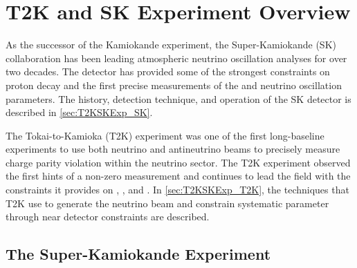 \chapter{T2K and SK Experiment Overview}
\label{chap:T2KSKExp}

As the successor of the Kamiokande experiment, the Super-Kamiokande (SK) collaboration has been leading atmospheric neutrino oscillation analyses for over two decades. The detector has provided some of the strongest constraints on proton decay and the first precise measurements of the  and  neutrino oscillation parameters.
The history, detection technique, and operation of the SK detector is described in \autoref{sec:T2KSKExp_SK}.

The Tokai-to-Kamioka (T2K) experiment was one of the first long-baseline experiments to use both neutrino and antineutrino beams to precisely measure charge parity violation within the neutrino sector. The T2K experiment observed the first hints of a non-zero  measurement and continues to lead the field with the constraints it provides on , ,  and .
In \autoref{sec:T2KSKExp_T2K}, the techniques that T2K use to generate the neutrino beam and constrain systematic parameter through near detector constraints are described.


\section{The Super-Kamiokande Experiment}
\label{sec:T2KSKExp_SK}

